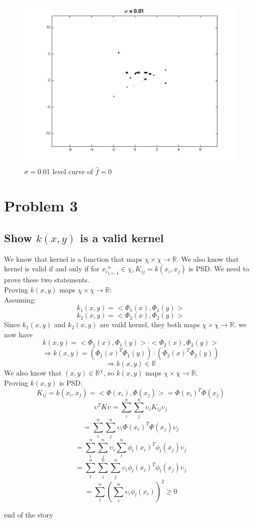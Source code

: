 \documentclass[twoside]{article}
\theoremstyle{definition}
\theoremstyle{definition}
\theoremstyle{remark}
\def\R{{\mathbb R}}
\begin{document}
\begin{figure}[H]
\centering
\includegraphics[width=120mm]{sigma_001_lc.jpg}
\caption{ $\sigma = 0.01$ level curve of $\hat f = 0$ \label{problem2Pic6}}
\end{figure}

\section{Problem 3}
\subsection{Show $k(x,y)$ is a valid kernel}
We know that kernel is a function that maps $\chi \times \chi \rightarrow \R$. 
We also know that kernel is valid if and only if for ${x_i}_{i=1}^n \in \chi, K_{ij} = k(x_i,x_j)$ is PSD. We need to prove these two statements.\\ 
Proving $k(x,y)$ maps $\chi \times \chi \rightarrow \R$:\\ 
Assuming:
\[k_1(x,y) = <\Phi_1(x),\Phi_1(y)>\]
\[k_2(x,y) = <\Phi_2(x),\Phi_2(y)>\]
Since $k_1(x,y)$ and $k_2(x,y)$ are vaild kernel, they both maps $\chi \times \chi \rightarrow \R$. 
we now have 
\[k(x,y) = <\Phi_1(x),\Phi_1(y)>\cdot <\Phi_2(x),\Phi_2(y)>\]
\[\Rightarrow k(x,y) = (\Phi_1(x)^T \Phi_1(y))\cdot(\Phi_2(x)^T\Phi_2(y))\]
\[\Rightarrow k(x,y) \in \R\]
We also know that $(x,y) \in \R^\chi$, so $k(x,y)$ maps $\chi \times \chi \rightarrow \R$.\\
Proving $k(x,y)$ is PSD:
\[K_{ij} = k(x_i,x_j) =  <\Phi(x_i),\Phi(x_j)> =\Phi(x_i)^T\Phi(x_j) \]
\[\upsilon^T K \upsilon = \sum_i^n \sum_j^n \upsilon_i K_{ij} \upsilon_j\]
\[=\sum_i^n \sum_j^n \upsilon_i \Phi(x_i)^T\Phi(x_j) \upsilon_j\]
\[=\sum_i^n \sum_j^n \upsilon_i \sum_l^n \phi_l(x_i)^T\phi_l(x_j) \upsilon_j\]
\[=\sum_l^n \sum_i^n \sum_j^n \upsilon_i \phi_l(x_i)^T\phi_l(x_j) \upsilon_j\]
\[=\sum_l^n(\sum_i^n \upsilon_i \phi_l(x_i))^2 \geq 0\]



 
end of the story
\end{document}
